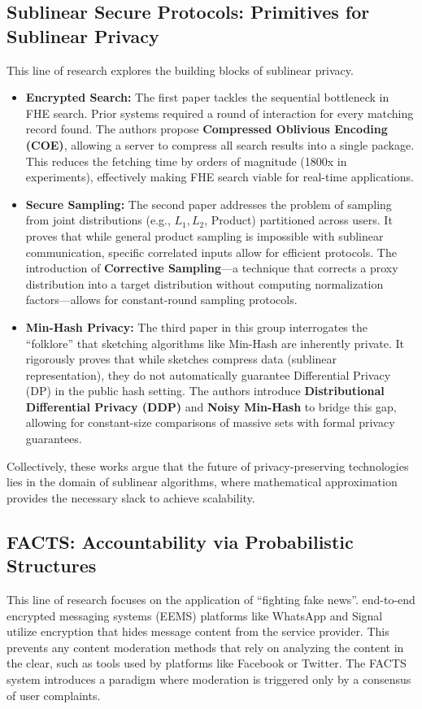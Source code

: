 \subsection{Sublinear Secure Protocols: Primitives for Sublinear Privacy}
This line of research explores the building blocks of sublinear privacy.
\begin{itemize}
    \item \textbf{Encrypted Search:} The first paper tackles the sequential bottleneck in FHE search. Prior systems required a round of interaction for every matching record found. The authors propose \textbf{Compressed Oblivious Encoding (COE)}, allowing a server to compress all search results into a single package. This reduces the fetching time by orders of magnitude (1800x in experiments), effectively making FHE search viable for real-time applications.
    \item \textbf{Secure Sampling:} The second paper addresses the problem of sampling from joint distributions (e.g., $L_1, L_2$, Product) partitioned across users. It proves that while general product sampling is impossible with sublinear communication, specific correlated inputs allow for efficient protocols. The introduction of \textbf{Corrective Sampling}—a technique that corrects a proxy distribution into a target distribution without computing normalization factors—allows for constant-round sampling protocols.
    \item \textbf{Min-Hash Privacy:} The third paper in this group interrogates the ``folklore'' that sketching algorithms like Min-Hash are inherently private. It rigorously proves that while sketches compress data (sublinear representation), they do not automatically guarantee Differential Privacy (DP) in the public hash setting. The authors introduce \textbf{Distributional Differential Privacy (DDP)} and \textbf{Noisy Min-Hash} to bridge this gap, allowing for constant-size comparisons of massive sets with formal privacy guarantees.
\end{itemize}

Collectively, these works argue that the future of privacy-preserving technologies lies in the domain of sublinear algorithms, where mathematical approximation provides the necessary slack to achieve scalability.

\subsection{FACTS: Accountability via Probabilistic Structures}
This line of research focuses on the application of ``fighting fake news''. end-to-end encrypted messaging systems (EEMS) platforms like WhatsApp and Signal utilize encryption that hides message content from the service provider. This prevents any content moderation methods that rely on analyzing the content in the clear, such as tools used by platforms like Facebook or Twitter. The FACTS system introduces a paradigm where moderation is triggered only by a consensus of user complaints.

